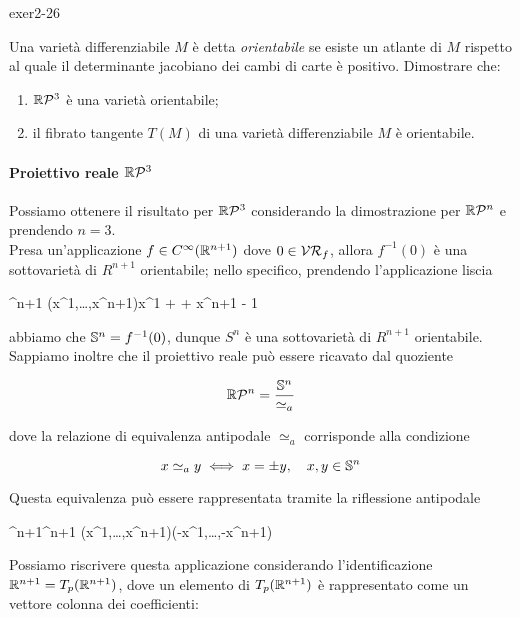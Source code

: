 {exer2-26}
{
Una varietà differenziabile $ M $ è detta \textit{orientabile} se esiste un atlante di $ M $ rispetto al quale il determinante jacobiano dei cambi di carte è positivo. Dimostrare che:

\begin{enumerate}
	\item $ \rp{3} $ è una varietà orientabile;
	\item il fibrato tangente $ T(M) $ di una varietà differenziabile $ M $ è orientabile.
\end{enumerate}
}
{
\paragraph{Proiettivo reale $ \rp{3} $}

Possiamo ottenere il risultato per $ \rp{3} $ considerando la dimostrazione per $ \rp{n} $ e prendendo $ n = 3 $. \\
Presa un'applicazione $ f \in C^{\infty}(\R^{n+1}) $ dove $ 0 \in \VR_{f} $, allora $ f^{-1}(0) $ è una sottovarietà di $ R^{n+1} $ orientabile; nello specifico, prendendo  l'applicazione liscia

	{\R^{n+1}}{\R}
	{(x^{1},\dots,x^{n+1})}{x^{1} + \cdots + x^{n+1} - 1}

abbiamo che $ \S^{n} = f^{-1}(0) $, dunque $ S^{n} $ è una sottovarietà di $ R^{n+1} $ orientabile. \\
Sappiamo inoltre che il proiettivo reale può essere ricavato dal quoziente

\begin{equation}
	\rp{n} = \dfrac{\S^{n}}{\simeq_{a}}
\end{equation}

dove la relazione di equivalenza antipodale $ \simeq_{a} $ corrisponde alla condizione

\begin{equation}
	x \simeq_{a} y \iff x = \pm y \qcomma x,y \in \S^{n}
\end{equation}

Questa equivalenza può essere rappresentata tramite la riflessione antipodale

	{\R^{n+1}}{\R^{n+1}}
	{(x^{1},\dots,x^{n+1})}{(-x^{1},\dots,-x^{n+1})}

Possiamo riscrivere questa applicazione considerando l'identificazione $ \R^{n+1} = T_{p}(\R^{n+1}) $, dove un elemento di $ T_{p}(\R^{n+1}) $ è rappresentato come un vettore colonna dei coefficienti:

}
